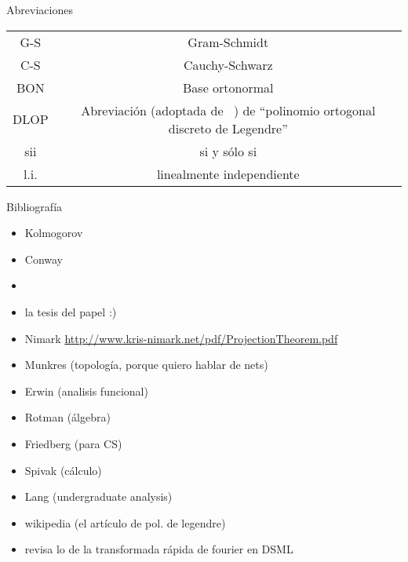 \begin{center}
\huge{Abreviaciones}
\end{center}

\vspace{0.5cm}

\begin{tabular}{ c c }
 G-S & Gram-Schmidt \\
 C-S & Cauchy-Schwarz \\
 BON & Base ortonormal \\
 DLOP & Abreviación (adoptada de ~\cite{Neuman})
 de ``polinomio ortogonal discreto de Legendre'' \\
 sii & si y sólo si \\
 l.i. & linealmente independiente
\end{tabular}


\begin{center}
\huge{Bibliografía}
\end{center}
\begin{itemize}
\item Kolmogorov
\item Conway
\item {}
\item la tesis del papel :)
\item Nimark
\url{http://www.kris-nimark.net/pdf/ProjectionTheorem.pdf}
\item Munkres (topología, porque quiero hablar de nets)
\item Erwin (analisis funcional)
\item Rotman (álgebra)
\item Friedberg (para CS)
\item Spivak (cálculo)
\item Lang (undergraduate analysis)
\item wikipedia (el artículo de pol. de legendre)
\item revisa lo de la transformada rápida de fourier en DSML
\end{itemize}











\newpage